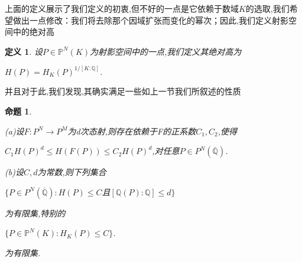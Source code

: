 \documentclass[11pt]{ctexart}
\newtheorem{defi}{定义}[section]
\newtheorem{pro}{命题}[section]
\begin{document}
上面的定义展示了我们定义的初衷,但不好的一点是它依赖于数域$K$的选取,我们希望做出一点修改：我们将去除那个因域扩张而变化的幂次；因此,我们定义射影空间中的绝对高
\begin{defi}\label{aht}设$P \in \mathbb{P}^N(K)$为射影空间中的一点,我们定义其绝对高为
    \begin{center}
       $ H(P)=H_K(P)^{1/[K:\mathbb{Q}]}$.
    \end{center}
\end{defi}
并且对于此,我们发现,其确实满足一些如上一节我们所叙述的性质
\begin{pro}\label{5.9}

    (a)设$F:P^N\rightarrow P^M$为d次态射,则存在依赖于F的正系数$C_1,C_2$,使得
     \begin{center}
        $C_1H(P)^d\leqslant H(F(P))\leqslant C_2H(P)^d$,对任意$P \in P^N(\overline{\mathbb{Q}})$.
     \end{center}

    \noindent (b)设$C,d$为常数,则下列集合
    \begin{center}
        $\{P \in P^N(\overline{\mathbb{Q}}):H(P)\leqslant C$且$[\mathbb{Q}(P):\mathbb{Q}]\leqslant d\}$

    \end{center}
     为有限集,特别的
     \begin{center}
        $\{P \in \mathbb{P}^N(K):H_K(P)\leqslant C\}$.
     \end{center}
    为有限集.
\end{pro}
\end{document}
